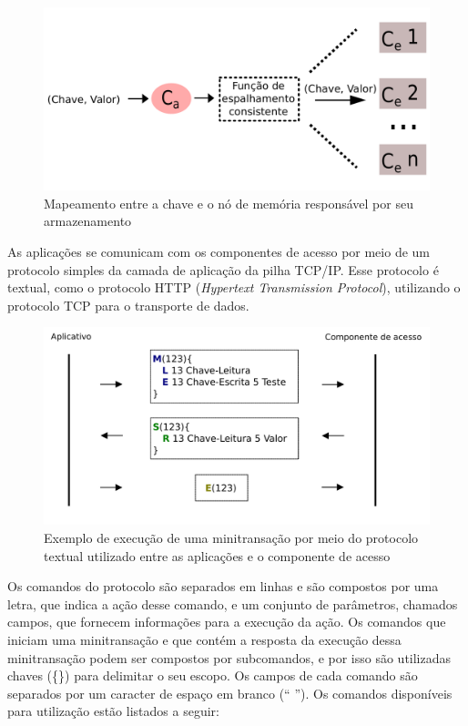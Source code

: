 \documentclass[11pt,twoside,a4paper]{book}
\begin{document}
\begin{figure}
  \centering
  \includegraphics[width=.80\textwidth]{funcao_espalhamento} 
  \caption{Mapeamento entre a chave e o nó de memória responsável por seu armazenamento}
  \label{fig:funcao_espalhamento} 
\end{figure}

As aplicações se comunicam com os componentes de acesso por meio de um protocolo simples da camada de aplicação da pilha TCP/IP. Esse protocolo é textual, como o protocolo HTTP (\emph{Hypertext Transmission Protocol}), utilizando o protocolo TCP para o transporte de dados. 

\begin{figure}
  \centering
  \includegraphics[width=.80\textwidth]{protocolo} 
  \caption{Exemplo de execução de uma minitransação por meio do protocolo textual utilizado entre as aplicações e o componente de acesso}
  \label{fig:protocolo} 
\end{figure}

Os comandos do protocolo são separados em linhas e são compostos por uma letra, que indica a ação desse comando, e um conjunto de parâmetros, chamados campos, que fornecem informações para a execução da ação. Os comandos que iniciam uma minitransação e que contém a resposta da execução dessa minitransação podem ser compostos por subcomandos, e por isso são utilizadas chaves (\{\}) para delimitar o seu escopo. Os campos de cada comando são separados por um caracter de espaço em branco (`` ''). Os comandos disponíveis para utilização estão listados a seguir:
\end{document}
